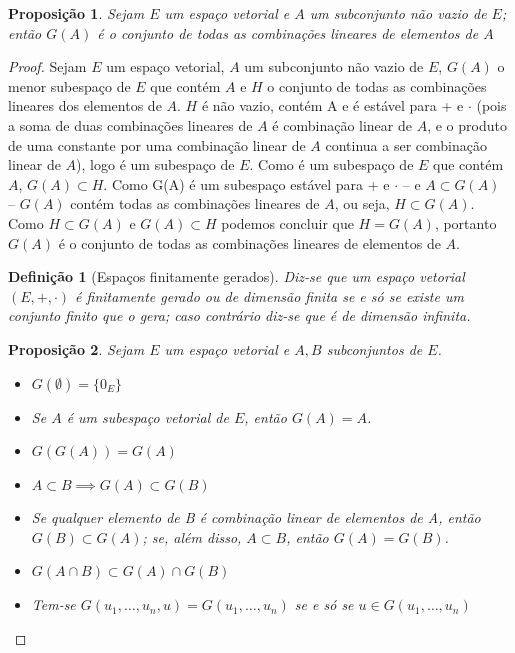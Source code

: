 \documentclass{article}
\newtheorem{proposition}{Proposição}[section]
\newtheorem{definition}{Definição}[section]
\begin{document}
	\begin{proposition}
		Sejam $E$ um espaço vetorial e $A$ um subconjunto não vazio de $E$; então $G(A)$ é o conjunto de todas as combinações lineares de elementos de $A$

	\end{proposition}

	\begin{proof}
		Sejam $E$ um espaço vetorial, $A$ um subconjunto não vazio de $E$, $G(A)$ o menor subespaço de $E$ que contém $A$ e $H$ o conjunto de todas as combinações lineares dos elementos de $A$.
		$H$ é não vazio, contém A e é estável para + e $\cdot$ (pois a soma de duas combinações lineares de $A$ é combinação linear de $A$, e o produto de uma constante por uma combinação linear de $A$ continua a ser combinação linear de $A$), logo é um subespaço de $E$. Como é um subespaço de $E$ que contém $A$, $G(A)\subset H$.
		Como G(A) é um subespaço estável para + e $\cdot$ -- e $A\subset G(A)$ -- $G(A)$ contém todas as combinações lineares de $A$, ou seja, $H\subset G(A)$.
		Como $H\subset G(A)$ e $G(A)\subset H$ podemos concluir que $H=G(A)$, portanto $G(A)$ é o conjunto de todas as combinações lineares de elementos de $A$.
	
	

	\begin{definition}[Espaços finitamente gerados]
		Diz-se que um espaço vetorial $(E,+,\cdot)$ é finitamente gerado ou de dimensão finita se e só se existe um conjunto finito que o gera; caso contrário diz-se que é de dimensão infinita.

	\end{definition}

	\begin{proposition}
		Sejam $E$ um espaço vetorial e $A,B$ subconjuntos de $E$.
		\begin{itemize}
			\item $G(\emptyset)=\{0_E\}$
    			\item Se $A$ é um subespaço vetorial de $E$, então $G(A)=A$.
    			\item $G(G(A))=G(A)$
    			\item $A\subset B \implies G(A) \subset G(B)$
    			\item Se qualquer elemento de B é combinação linear de elementos de A, então $G(B)\subset G(A)$; se, além disso, $A\subset B$, então $G(A)=G(B)$.
    			\item $G(A\cap B) \subset G(A)\cap G(B)$
    			\item Tem-se $G({u_1,\dots,u_n,u})=G({u_1,\dots,u_n})$ se e só se $u \in G({u_1,\dots,u_n})$
		\end{itemize}


\end{proposition}
\end{proof}
\end{document}
